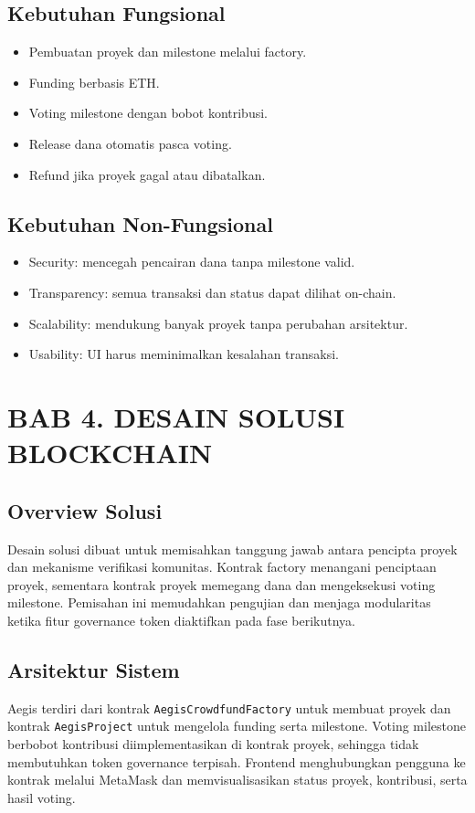 \documentclass[12pt]{article}
\begin{document}
\subsection{Kebutuhan Fungsional}
\begin{itemize}[leftmargin=1.2em]
  \item Pembuatan proyek dan milestone melalui factory.
  \item Funding berbasis ETH.
  \item Voting milestone dengan bobot kontribusi.
  \item Release dana otomatis pasca voting.
  \item Refund jika proyek gagal atau dibatalkan.
\end{itemize}

\subsection{Kebutuhan Non-Fungsional}
\begin{itemize}[leftmargin=1.2em]
  \item Security: mencegah pencairan dana tanpa milestone valid.
  \item Transparency: semua transaksi dan status dapat dilihat on-chain.
  \item Scalability: mendukung banyak proyek tanpa perubahan arsitektur.
  \item Usability: UI harus meminimalkan kesalahan transaksi.
\end{itemize}

\section{BAB 4. DESAIN SOLUSI BLOCKCHAIN}
\subsection{Overview Solusi}
Desain solusi dibuat untuk memisahkan tanggung jawab antara pencipta proyek dan mekanisme verifikasi komunitas. Kontrak factory menangani penciptaan proyek, sementara kontrak proyek memegang dana dan mengeksekusi voting milestone. Pemisahan ini memudahkan pengujian dan menjaga modularitas ketika fitur governance token diaktifkan pada fase berikutnya.

\subsection{Arsitektur Sistem}
Aegis terdiri dari kontrak \texttt{AegisCrowdfundFactory} untuk membuat proyek dan kontrak \texttt{AegisProject} untuk mengelola funding serta milestone. Voting milestone berbobot kontribusi diimplementasikan di kontrak proyek, sehingga tidak membutuhkan token governance terpisah. Frontend menghubungkan pengguna ke kontrak melalui MetaMask dan memvisualisasikan status proyek, kontribusi, serta hasil voting.
\end{document}
